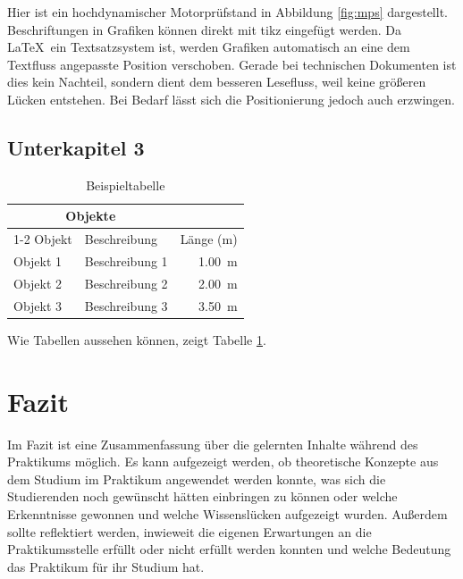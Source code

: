 \documentclass[
a4paper,
oneside,
12pt,
titlepage]
{scrartcl}
\begin{document}
 Hier ist ein hochdynamischer Motorprüfstand in Abbildung \ref{fig:mps} dargestellt. Beschriftungen in Grafiken können direkt mit tikz eingefügt werden. Da \LaTeX \  ein Textsatzsystem ist, werden Grafiken automatisch an eine dem Textfluss angepasste Position verschoben. Gerade bei technischen Dokumenten ist dies kein Nachteil, sondern dient dem besseren Lesefluss, weil keine größeren Lücken entstehen. Bei Bedarf lässt sich die Positionierung jedoch auch erzwingen.
 
 \subsection{Unterkapitel 3}



\begin{table}[ht]
    \centering
    \begin{tabular}{llr}
\hline
\multicolumn{2}{c}{Objekte} \\ 
\cline{1-2}
Objekt    & Beschreibung & Länge (\unit{\metre}) \\
\hline
Objekt 1      & Beschreibung 1    & \qty{1.00}{\metre}      \\
Objekt 2      & Beschreibung 2    & \qty{2.00}{\metre}       \\ 
Objekt 3      & Beschreibung 3    & \qty{3.50}{\metre}      \\

\hline
\end{tabular}
    \caption{Beispieltabelle}
    \label{tab:bsp}
\end{table}

Wie Tabellen aussehen können, zeigt Tabelle \ref{tab:bsp}.

\section{Fazit}
Im Fazit ist eine Zusammenfassung über die gelernten Inhalte während des Praktikums möglich. Es kann aufgezeigt werden, ob theoretische Konzepte aus dem Studium im Praktikum angewendet werden konnte, was sich die Studierenden noch gewünscht hätten einbringen zu können oder welche Erkenntnisse gewonnen und welche Wissenslücken aufgezeigt wurden. Außerdem sollte reflektiert werden, inwieweit die eigenen Erwartungen an die Praktikumsstelle erfüllt oder nicht erfüllt werden konnten und welche Bedeutung das Praktikum für ihr Studium hat.

\newpage
\printbibliography

\end{document}
